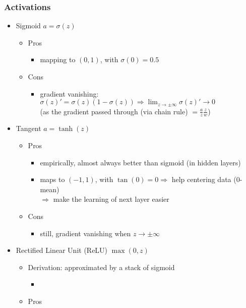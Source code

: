 \subsubsection{Activations}
\begin{itemize}
\item Sigmoid $a=\sigma(z)$
	\begin{itemize}
	\item Pros
		\begin{itemize}
		\item mapping to $(0,1)$, with $\sigma(0)=0.5$
		\end{itemize}
	\item Cons
		\begin{itemize}
		\item gradient vanishing: $\displaystyle \sigma(z)' = \sigma(z)(1-\sigma(z)) \Rightarrow \lim_{z\rightarrow \pm \infty} \sigma(z)' \rightarrow 0$ \\
		(as the gradient passed through (via chain rule) $=\frac{a}{z} \frac{z}{w}$)
		\end{itemize}
	\end{itemize}
\item Tangent $a=\tanh(z)$
	\begin{itemize}
	\item Pros
		\begin{itemize}
		\item empirically, almost always better than sigmoid (in hidden layers)
		\item maps to $(-1,1)$, with $\tan(0)=0 \Rightarrow$ help centering data ($0$-mean) \\ $\Rightarrow$ make the learning of next layer easier
		\end{itemize}
	\item Cons
		\begin{itemize}
		\item still, gradient vanishing when $z\rightarrow \pm \infty$
		\end{itemize}
	\end{itemize}
\item Rectified Linear Unit (ReLU) $\max(0, z)$ \label{DL_Act_ReLU}
	\begin{itemize}
	\item Derivation: approximated by a stack of sigmoid
		\begin{itemize}
		\item 
		\end{itemize}
	\item Pros
		\begin{itemize}

\end{itemize}
\end{itemize}
\end{itemize}
